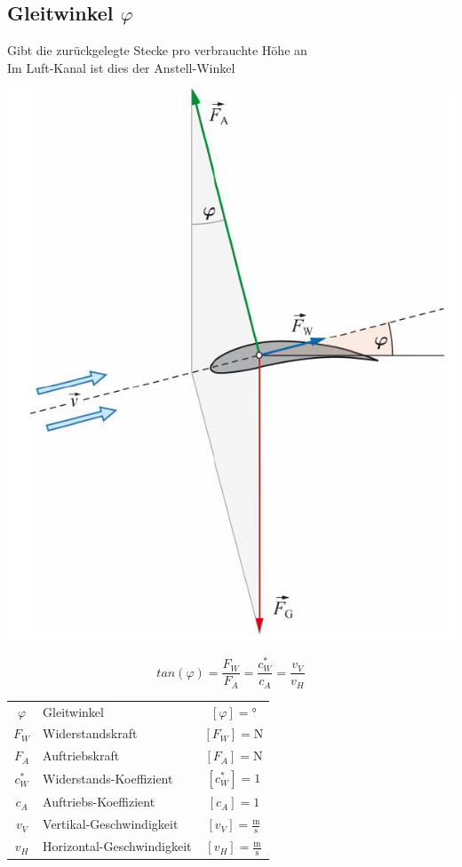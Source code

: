 \vfill\null
\columnbreak

\subsection{Gleitwinkel $\varphi$}
Gibt die zurückgelegte Stecke pro verbrauchte Höhe an \\
Im Luft-Kanal ist dies der Anstell-Winkel \\

\begin{minipage}{0.5\linewidth}
	\includegraphics[width=\linewidth]{Bilder/gleitwinkel.png}
\end{minipage}
\hfill
\begin{minipage}{0.45\linewidth}
	$$ \boxed{ tan(\varphi) = \frac{F_W}{F_A} = \frac{c^*_W}{c_A}= \frac{v_V}{v_H} }	$$

	\begin{tabular}{c l c}
		$\varphi$ & Gleitwinkel & $[\varphi] = \text{°}$ \\
		$F_W$ & Widerstandskraft & $[F_W] = \mathrm{N}$ \\
		$F_A$ & Auftriebskraft & $[F_A] = \mathrm{N}$ \\ 
		$c^*_W$ & Widerstands-Koeffizient & $[c^*_W] = 1$ \\
		$c_A$ & Auftriebs-Koeffizient & $[c_A] = 1$ \\
		\rule{0pt}{8pt}$v_V$ & Vertikal-Geschwindigkeit & $[v_V] = \mathrm{\frac{m}{s}}$ \\
		\rule{0pt}{8pt}$v_H$ & Horizontal-Geschwindigkeit & $[v_H] = \mathrm{\frac{m}{s}}$ \\
	\end{tabular}
\end{minipage}



